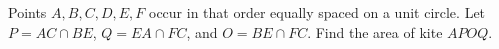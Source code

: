 Points $A,B,C,D,E,F$ occur in that order equally spaced on a unit circle. Let $P=AC\cap BE$, $Q=EA\cap FC$, and $O=BE\cap FC$. Find the area of kite $APOQ$.
